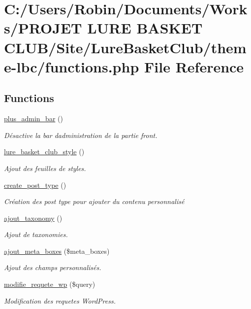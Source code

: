 \hypertarget{functions_8php}{}\section{C\+:/\+Users/\+Robin/\+Documents/\+Works/\+P\+R\+O\+J\+ET L\+U\+RE B\+A\+S\+K\+ET C\+L\+U\+B/\+Site/\+Lure\+Basket\+Club/theme-\/lbc/functions.php File Reference}
\label{functions_8php}
\subsection*{Functions}
\begin{DoxyCompactItemize}
\item 
\hyperlink{functions_8php_abc0237fdc1b4f1a45f7c02c88eccc682}{plus\+\_\+admin\+\_\+bar} ()
\begin{DoxyCompactList}\small\item\em Désactive la bar d\textquotesingle{}administration de la partie front. \end{DoxyCompactList}\item 
\hyperlink{functions_8php_acab88b98993dd5d04296218f6bb5ed36}{lure\+\_\+basket\+\_\+club\+\_\+style} ()
\begin{DoxyCompactList}\small\item\em Ajout des feuilles de styles. \end{DoxyCompactList}\item 
\hyperlink{functions_8php_ad04a983b8ad9dfafb94434ffcac2e6ef}{create\+\_\+post\+\_\+type} ()
\begin{DoxyCompactList}\small\item\em Création des post type pour ajouter du contenu personnalisé \end{DoxyCompactList}\item 
\hyperlink{functions_8php_a082ce3c9f404dc0998106017b82ae9ba}{ajout\+\_\+taxonomy} ()
\begin{DoxyCompactList}\small\item\em Ajout de taxonomies. \end{DoxyCompactList}\item 
\hyperlink{functions_8php_aea51bb810ad63c0c020915c08fff675e}{ajout\+\_\+meta\+\_\+boxes} (\$meta\+\_\+boxes)
\begin{DoxyCompactList}\small\item\em Ajout des champs personnalisés. \end{DoxyCompactList}\item 
\hyperlink{functions_8php_a23af4c955cb3f46b3b1e0e0f3748da6a}{modifie\+\_\+requete\+\_\+wp} (\$query)
\begin{DoxyCompactList}\small\item\em Modification des requetes Word\+Press. \end{DoxyCompactList}\end{DoxyCompactItemize}



